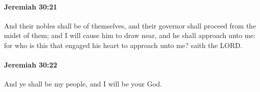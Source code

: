 		\paragraph{Jeremiah 30:21} %
			\label{JEREMIAH-30-21}

			And their nobles shall be of themselves, and their governor shall proceed from the midst of them; and I will cause him to draw near, and he shall approach unto me: for who is this that engaged his heart to approach unto me? saith the LORD.


		\paragraph{Jeremiah 30:22} %
			\label{JEREMIAH-30-22}

			And ye shall be my people, and I will be your God.


